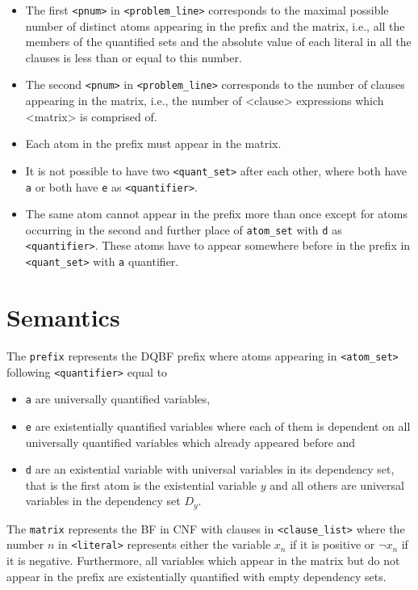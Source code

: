 \documentclass[
  digital, %
  color,
  twoside, %
  table,   %
  nolof,     %
  nolot,     %
]{fithesis3}
\theoremstyle{definition}
\theoremstyle{remark}
\begin{document}
\begin{itemize}
    \item The first \verb|<pnum>| in \verb|<problem_line>| corresponds to the maximal possible number of distinct atoms appearing in the prefix and the matrix, i.e., all the members of the quantified sets and the absolute value of each literal in all the clauses is less than or equal to this number.
    \item \begin{sloppypar} The second \verb|<pnum>| in \verb|<problem_line>| corresponds to the number of clauses appearing in the matrix, i.e., the number of <clause> expressions which <matrix> is comprised of. \end{sloppypar}
    \item Each atom in the prefix must appear in the matrix.
    \item It is not possible to have two \verb|<quant_set>| after each other, where both have \verb|a| or both have \verb|e| as \verb|<quantifier>|.
    \item The same atom cannot appear in the prefix more than once except for atoms occurring in the second and further place of \verb|atom_set| with \verb|d| as \verb|<quantifier>|. These atoms have to appear somewhere before in the prefix in \verb|<quant_set>| with \verb|a| quantifier.
\end{itemize}

\section{Semantics}
The \verb|prefix| represents the DQBF prefix where atoms appearing in \verb|<atom_set>| following \verb|<quantifier>| equal to
\begin{itemize}
    \item \verb|a| are universally quantified variables,
    \item \verb|e| are existentially quantified variables where each of them is dependent on all universally quantified variables which already appeared before and 
    \item \verb|d| are an existential variable with universal variables in its dependency set, that is the first atom is the existential variable $y$ and all others are universal variables in the dependency set $D_y$.
\end{itemize}

\begin{sloppypar}
The \verb|matrix| represents the BF in CNF with clauses in \verb|<clause_list>| where the number $n$ in \verb|<literal>| represents either the variable $x_n$ if it is positive or $\neg x_n$ if it is negative. Furthermore, all variables which appear in the matrix but do not appear in the prefix are existentially quantified with empty dependency sets. 
\end{sloppypar}
\end{document}

